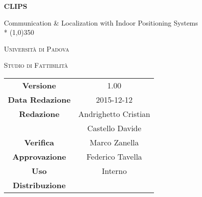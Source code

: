 \documentclass[a4paper,12pt]{article}
\author{Andrighetto Cristian, Castello Davide}
\date{27/12/2015}
\begin{document}
	\begin{titlepage}
		\centering
		{\huge\bfseries CLIPS\par}
		Communication \& Localization with Indoor Positioning Systems \\*
		\line(1,0){350} \\
		{\scshape\LARGE Università di Padova \par}
		\vspace{1cm}
		{\scshape\Large Studio di Fattibilità \par}
		\logo
		\newpage
		\begin{tabular}{c|c}
			{\hfill \textbf{Versione}} 			& 1.00			\\
			{\hfill\textbf{Data Redazione}} 		& 2015-12-12  		\\ 
			{\hfill\textbf{Redazione}} 			&  Andrighetto Cristian \\ 
			& Castello Davide       \\
			{\hfill\textbf{Verifica}} 				&  Marco Zanella   \\
			{\hfill\textbf{Approvazione}} 		& Federico Tavella \\
			{\hfill\textbf{Uso}} 					& Interno			\\
			{\hfill\textbf{Distribuzione}} 			& \leaf			\\
		\end{tabular}
    \end{titlepage}
	
	\newpage
		\pagestyle{myfront}
		
	
	\newpage
		\tableofcontents
	
	\label{LastFrontPage}
	
	\newpage
	\pagestyle{mymain}
		
	\newpage
		
	\newpage
		
	\newpage
		
\label{LastPage}
\end{document}
